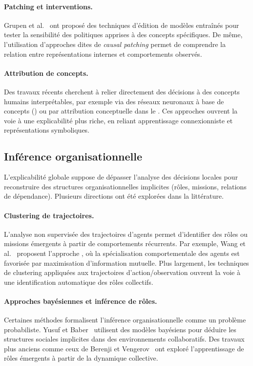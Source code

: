 \paragraph{Patching et interventions.}
Grupen et al.~\cite{grupen2022concept} ont proposé des techniques
d’édition de modèles entraînés pour tester la sensibilité
des politiques apprises à des concepts spécifiques.
De même, l’utilisation d’approches dites de \textit{causal patching}
\cite{geiger2021causal} permet de comprendre la relation entre
représentations internes et comportements observés.

\paragraph{Attribution de concepts.}
Des travaux récents cherchent à relier directement des décisions
à des concepts humains interprétables,
par exemple via des réseaux neuronaux à base de concepts ()
\cite{kim2018interpretability}
ou par attribution conceptuelle dans le 
\cite{zabounidis2023concept}.
Ces approches ouvrent la voie à une explicabilité plus riche,
en reliant apprentissage connexionniste et représentations symboliques.

\subsection{Inférence organisationnelle}

\noindent
L’explicabilité globale suppose de dépasser l’analyse des décisions locales
pour reconstruire des structures organisationnelles implicites
(rôles, missions, relations de dépendance).
Plusieurs directions ont été explorées dans la littérature.

\paragraph{Clustering de trajectoires.}
L’analyse non supervisée des trajectoires d’agents permet d’identifier
des rôles ou missions émergents à partir de comportements récurrents.
Par exemple, Wang et al.~\cite{Wang2020} proposent l’approche , où la spécialisation comportementale
des agents est favorisée par maximisation d’information mutuelle.
Plus largement, les techniques de clustering appliquées aux trajectoires
d’action/observation ouvrent la voie à une identification
automatique des rôles collectifs.

\paragraph{Approches bayésiennes et inférence de rôles.}
Certaines méthodes formalisent l’inférence organisationnelle
comme un problème probabiliste.
Yusuf et Baber~\cite{yusuf2020inferential} utilisent des modèles bayésiens
pour déduire les structures sociales implicites dans des environnements collaboratifs.
Des travaux plus anciens comme ceux de Berenji et Vengerov~\cite{berenji2000learning}
ont exploré l’apprentissage de rôles émergents à partir de la dynamique collective.

